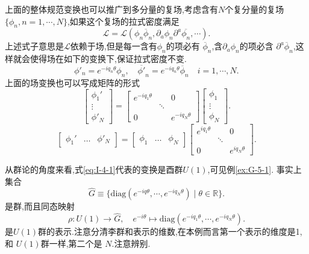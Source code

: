 \documentclass[../main.tex]{subfiles}
\begin{document}
上面的整体规范变换也可以推广到多分量的复场,考虑含有$N$个复分量的复场$\{\phi_n, n = 1, \cdots ,N\}$,如果这个复场的拉式密度满足\[
\mathscr{L} = \mathscr{L}(\phi_n \overline{\phi}_n, \partial_a \phi_n \partial^a \overline{\phi_n},\cdots)
.\] 
上述式子意思是$\mathscr{L}$依赖于场,但是每一含有$\phi_n$的项必有 $\overline{\phi}_n$,含$\partial_a \phi_n$的项必含 $\partial^a \overline{\phi}_n$,这样就会使得场在如下的变换下,保证拉式密度不变.\[
  \phi'_n = e^{-iq_n \theta} \phi_n, \quad \overline{\phi'}_n = e^{-iq_n \theta} \overline{\phi}_n \quad i = 1, \cdots ,N
.\] 
上面的场变换也可以写成矩阵的形式\[
\begin{bmatrix}  \phi_1'\\ \vdots \\ \phi'_N\end{bmatrix} = 
\begin{bmatrix} e^{-iq_1\theta}&&0\\&\ddots& \\ 0 && e^{-iq_N \theta}  \end{bmatrix} 
\begin{bmatrix} \phi_1 \\ \vdots \\ \phi_N \end{bmatrix} 
.\] 
\[
\begin{bmatrix}  \phi_1'& \ldots & \phi'_N\end{bmatrix} = 
\begin{bmatrix} \phi_1 & \ldots & \phi_N \end{bmatrix} 
\begin{bmatrix} e^{iq_1\theta}&&0\\&\ddots& \\ 0 && e^{iq_N \theta}  \end{bmatrix} 
.\] 

从群论的角度来看,式\ref{eq:I-4-1}代表的变换是酉群$U(1)$,可见例\ref{ex:G-5-1}.
事实上集合\[
  \hat{G} \equiv \{\text{diag} (e ^{-iq \theta}, \cdots , e^{-i q_N \theta}) \mid \theta \in \mathbb{R} \}
.\] 
是群,而且同态映射\[
  \rho : U(1) \to \hat{G}, \quad  e^{-i\theta} \mapsto \text{diag}(e^{-iq_1\theta},\cdots , e^{-iq_N \theta})
.\] 
是$U(1)$群的表示.注意分清李群和表示的维数,在本例而言第一个表示的维度是1,和 $U(1)$群一样,第二个是 $N$.注意辨别.
\end{document}
